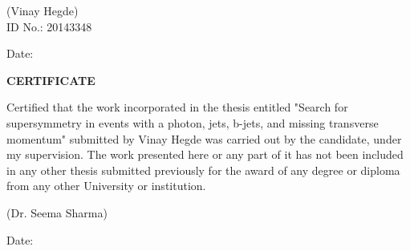 \documentclass[
11pt, %
english, %
singlespacing, %
headsepline, %
]{MastersDoctoralThesis} %
\begin{document}
\begin{flushright}
(Vinay Hegde) \\
ID No.: 20143348 
\end{flushright}
\begin{flushleft}
Date:
\end{flushleft}

\cleardoublepage

\cleardoublepage
{\begin{center}
\huge \textbf{CERTIFICATE}\\
\end{center}}
\noindent Certified that the work incorporated in the thesis entitled "Search for supersymmetry in events with a photon, jets, b-jets, and missing transverse momentum"
submitted by Vinay Hegde was carried out by the candidate, under my supervision. The
work presented here or any part of it has not been included in any other thesis submitted previously
for the award of any degree or diploma from any other University or institution.
\vspace{2cm}

\begin{flushright}
(Dr. Seema Sharma)
\end{flushright}
\begin{flushleft}
Date:
\end{flushleft}

\cleardoublepage


%
%

\end{document}
